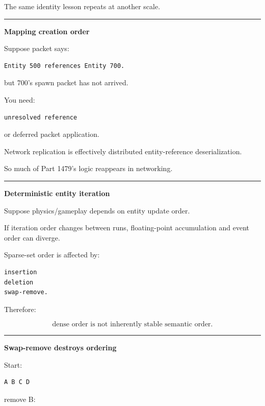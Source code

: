 The same identity lesson repeats at another scale.

\begin{center}\rule{0.5\linewidth}{0.5pt}\end{center}

\textbf{Mapping creation order}

Suppose packet says:

\begin{verbatim}
Entity 500 references Entity 700.
\end{verbatim}

but 700's spawn packet has not arrived.

You need:

\begin{verbatim}
unresolved reference
\end{verbatim}

or deferred packet application.

Network replication is effectively distributed entity-reference deserialization.

So much of Part 1479's logic reappears in networking.

\begin{center}\rule{0.5\linewidth}{0.5pt}\end{center}

\textbf{Deterministic entity iteration}

Suppose physics/gameplay depends on entity update order.

If iteration order changes between runs, floating-point accumulation and event order can diverge.

Sparse-set order is affected by:

\begin{verbatim}
insertion
deletion
swap-remove.
\end{verbatim}

Therefore:

\[
\boxed{
\text{dense order is not inherently stable semantic order}.
}
\]

\begin{center}\rule{0.5\linewidth}{0.5pt}\end{center}

\textbf{Swap-remove destroys ordering}

Start:

\begin{verbatim}
A B C D
\end{verbatim}

remove B:

